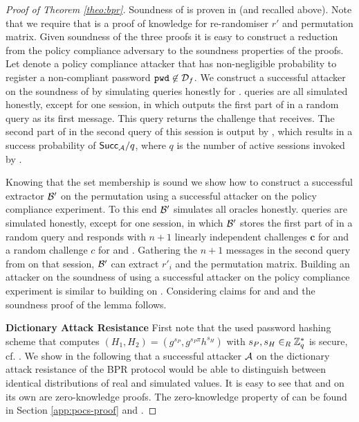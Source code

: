 \begin{proof}[Proof of Theorem \ref{theo:bpr}]
\noindent
Soundness of \PoS is proven in \cite{FurukawaS01,Furukawa05} (and recalled above).
Note that we require that \PoS is a proof of knowledge for re-randomiser $r'$ and permutation matrix.
Given soundness of the three proofs it is easy to construct a reduction from the policy compliance adversary to the soundness properties of the proofs.
Let \cA denote a policy compliance attacker that has non-negligible probability to register a non-compliant password  $\mathtt{pwd}\not\in\mathcal{D}_f$.
We construct a successful attacker \cB on the soundness of \PoM by simulating \Execute queries honestly for \cA.
\Send queries are all simulated honestly, except for one session, in which \cB outputs the first part of \PoM in a random \Send query as its first message.
This \Send query returns the challenge that \cB receives.
The second part of \PoM in the second \Send query of this session is output by \cB, which results in a success probability of $\mathsf{Succ}_{\mathcal{A}}/q$, where $q$ is the number of active sessions invoked by \cA.

Knowing that the set membership \PoM is sound we show how to construct a successful extractor $\mathcal{B}'$ on the permutation \PoS using a successful attacker \cA on the policy compliance experiment.
To this end $\mathcal{B}'$ simulates all \Execute oracles honestly.
\Send queries are simulated honestly, except for one session, in which $\mathcal{B}'$ stores the first part of \PoS in a random \Send query and responds with $n+1$ linearly independent challenges $\bm c$ for \PoS and a random challenge $c$ for \PoM and \PoE.
Gathering the $n+1$ messages in the second \Send query from \cA on that session, $\mathcal{B}'$ can extract $r'_i$ and the permutation matrix.
Building an attacker on the soundness of \PoE using a successful attacker \cA on the policy compliance experiment is similar to building \cB on \PoM.
Considering claims for \PoM and \PoE and the soundness proof of \PoS the lemma follows.
% 

\textbf{Dictionary Attack Resistance}
First note that the used password hashing scheme that computes $(H_1,H_2)=(g^{s_P},\allowbreak g^{s_P \pi}h^{s_H})$ with $s_P,s_H\in_R\mathbb{Z}^\ast_q$ is secure, cf. \cite{KieferM14}.
We show in the following that a successful attacker $\mathcal{A}$ on the dictionary attack resistance of the BPR protocol would be able to distinguish between identical distributions of real and simulated values.
It is easy to see that \PoM and \PoE on its own are zero-knowledge proofs.
The zero-knowledge property of \PoS can be found in Section \ref{app:pocs-proof} and \cite{FurukawaS01,Furukawa05}.


\end{proof}
